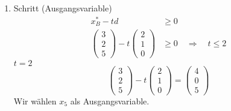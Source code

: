 \documentclass[a4paper]{scrartcl}
\begin{document}
\begin{enumerate}[label=\bfseries\arabic*.]
\begin{enumerate}
\begin{enumerate}[1.]
\begin{enumerate}[1.]
                            \item Schritt (Ausgangsvariable)
                                \begin{equation}
                                    \begin{split}
                                        x_B^* - td &\geq 0 \\
                                        \begin{pmatrix}
                                            3 \\ 2 \\ 5
                                        \end{pmatrix}
                                        - t
                                        \begin{pmatrix}
                                            2 \\ 1 \\ 0
                                        \end{pmatrix}
                                        &\geq 0
                                        \quad\Rightarrow\quad
                                        t \leq 2
                                    \end{split}
                                \end{equation}
                                $t = 2$
                                \begin{equation}
                                    \begin{pmatrix}
                                        3 \\ 2 \\ 5
                                    \end{pmatrix}
                                    - t
                                    \begin{pmatrix}
                                        2 \\ 1 \\ 0
                                    \end{pmatrix}
                                    =
                                    \begin{pmatrix}
                                        4 \\ 0 \\ 5
                                    \end{pmatrix}
                                \end{equation}
                                Wir wählen $x_5$ als Ausgangsvariable.


\end{enumerate}
\end{enumerate}
\end{enumerate}
\end{enumerate}
\end{document}
